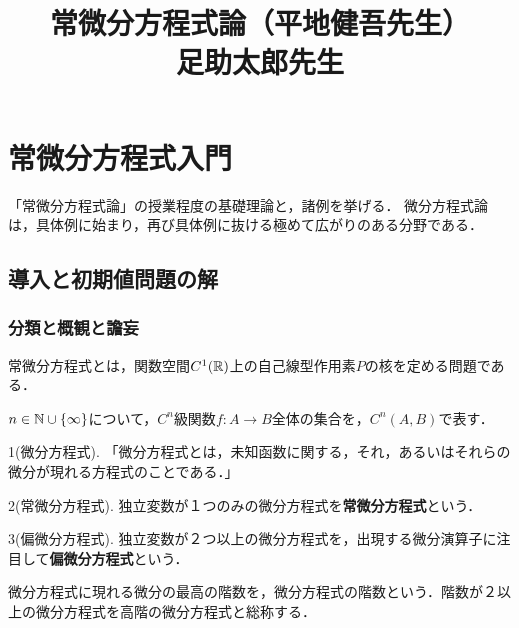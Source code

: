 \documentclass[uplatex,dvipdfmx]{jsreport}
\title{常微分方程式論（平地健吾先生）\\足助太郎先生}
\author{}
\begin{document}
\tableofcontents

\part{常微分方程式入門}
「常微分方程式論」の授業程度の基礎理論と，諸例を挙げる．
微分方程式論は，具体例に始まり，再び具体例に抜ける極めて広がりのある分野である．

\chapter{導入と初期値問題の解}

\section{分類と概観と譫妄}
常微分方程式とは，関数空間$C^1(\mathbb{R})$上の自己線型作用素$P$の核を定める問題である．

\begin{notation}
    $n\in\mathbb{N}\cup\{\infty\}$について，$C^n$級関数$f:A\to B$全体の集合を，$C^n(A,B)$で表す．
\end{notation}
\begin{definition}[常微分方程式]
    1(微分方程式). 「微分方程式とは，未知函数に関する，それ，あるいはそれらの微分が現れる方程式のことである．」

    2(常微分方程式). 独立変数が１つのみの微分方程式を\textbf{常微分方程式}という．

    3(偏微分方程式). 独立変数が２つ以上の微分方程式を，出現する微分演算子に注目して\textbf{偏微分方程式}という．
\end{definition}
\begin{definition}[階数]
    微分方程式に現れる微分の最高の階数を，微分方程式の階数という．階数が２以上の微分方程式を高階の微分方程式と総称する．
\end{definition}
\end{document}

